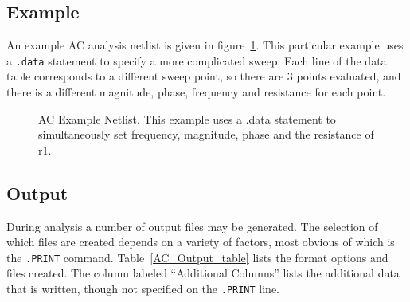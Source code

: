 \subsection{Example}
An example AC analysis netlist is given in figure~\ref{acExample}.  This particular example uses a \texttt{.data} statement to specify a more complicated sweep.  Each line of the data table corresponds to a different sweep point, so there are 3 points evaluated, and there is a different magnitude, phase, frequency and resistance for each point.
\begin{figure}[htbp]
  \begin{centering}
\caption[AC Example Netlist]
{AC Example Netlist.  This example uses a .data statement to simultaneously set frequency, magnitude, phase and the resistance of r1. \label{acExample} }
\end{centering}
\end{figure}

\subsection{Output}
\label{AC_Output}

During analysis a number of output files may be generated.  The
selection of which files are created depends on a variety of factors,
most obvious of which is the \texttt{.PRINT} command.
Table~\ref{AC_Output_table} lists the format options and files created.
The column labeled ``Additional Columns'' lists the additional data that
is written, though not specified on the \texttt{.PRINT} line.

